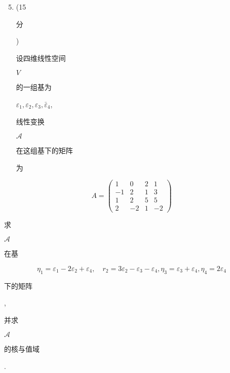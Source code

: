 \documentclass[10pt]{article}
\begin{document}
\begin{enumerate}
  \setcounter{enumi}{4}
  \item (15 \begin{CJK}{UTF8}{mj}分\end{CJK}) \begin{CJK}{UTF8}{mj}设四维线性空间\end{CJK} $V$ \begin{CJK}{UTF8}{mj}的一组基为\end{CJK} $\varepsilon_{1}, \varepsilon_{2}, \varepsilon_{3}, \bar{\varepsilon}_{4}$, \begin{CJK}{UTF8}{mj}线性变换\end{CJK} $\mathscr{A}$ \begin{CJK}{UTF8}{mj}在这组基下的矩阵\end{CJK} \begin{CJK}{UTF8}{mj}为\end{CJK}
\end{enumerate}
$$
A=\left(\begin{array}{cccc}
1 & 0 & 2 & 1 \\
-1 & 2 & 1 & 3 \\
1 & 2 & 5 & 5 \\
2 & -2 & 1 & -2
\end{array}\right)
$$
\begin{CJK}{UTF8}{mj}求\end{CJK} $\mathscr{A}$ \begin{CJK}{UTF8}{mj}在基\end{CJK}
$$
\eta_{1}=\varepsilon_{1}-2 \varepsilon_{2}+\varepsilon_{4}, \quad r_{2}=3 \varepsilon_{2}-\varepsilon_{3}-\varepsilon_{4}, \eta_{3}=\varepsilon_{3}+\varepsilon_{4}, \eta_{4}=2 \varepsilon_{4}
$$
\begin{CJK}{UTF8}{mj}下的矩阵\end{CJK}, \begin{CJK}{UTF8}{mj}并求\end{CJK} $\mathscr{A}$ \begin{CJK}{UTF8}{mj}的核与值域\end{CJK}.
\end{document}
